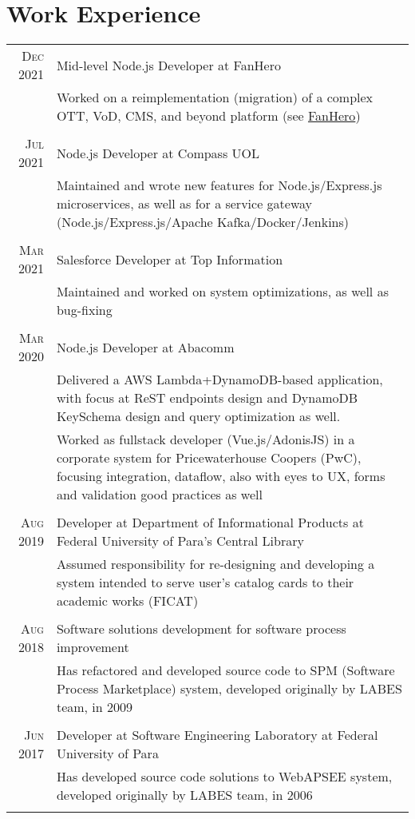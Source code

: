 \documentclass[a4paper,10pt]{article}
\begin{document}
\section{Work Experience}
\begin{tabular}{r|p{11cm}}
\textsc{Dec 2021} & Mid-level Node.js Developer at FanHero
 \\ & \footnotesize{Worked on a reimplementation (migration) of a complex OTT, VoD, CMS, and beyond platform (see \href{https://fanhero.com}{FanHero})}\\\\
\textsc{Jul 2021} & Node.js Developer at Compass UOL
   \\ & \footnotesize{Maintained and wrote new features for Node.js/Express.js microservices, as well as for a service gateway (Node.js/Express.js/Apache Kafka/Docker/Jenkins)}\\\\
\textsc{Mar 2021} & Salesforce Developer at Top Information
 \\ & \footnotesize{Maintained and worked on system optimizations, as well as bug-fixing}\\\\
 \textsc{Mar 2020} & Node.js Developer at Abacomm\\
    & \footnotesize{Delivered a AWS Lambda+DynamoDB-based application, with focus at ReST endpoints design and DynamoDB KeySchema design and query optimization as well.} \\
    & \footnotesize{Worked as fullstack developer (Vue.js/AdonisJS) in a corporate system for Pricewaterhouse Coopers (PwC), focusing integration, dataflow, also with eyes to UX, forms and validation good practices as well} \\\\
 \textsc{Aug 2019} & Developer at Department of Informational Products at Federal University of Para's Central Library\\ 
   & \footnotesize{Assumed responsibility for re-designing and developing a system intended to serve user's catalog cards to their academic works (FICAT)} \\\\
 \textsc{Aug 2018 }& Software solutions development for software process improvement\\& \footnotesize{Has refactored and developed source code to SPM (Software Process Marketplace) system, developed originally by LABES team, in 2009}\\\\
 \textsc{Jun 2017} & Developer at Software Engineering Laboratory at Federal University of Para \\ &\footnotesize{Has developed source code solutions to WebAPSEE system, developed originally by LABES team, in 2006}\\\multicolumn{2}{c}{} \\
\end{tabular}
\end{document}
